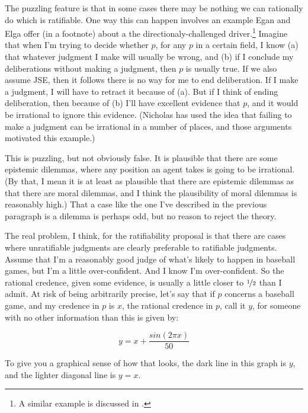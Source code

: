 The puzzling feature is that in some cases there may be nothing we can rationally do which is ratifiable. One way this can happen involves an example Egan and Elga offer (in a footnote) about a the directionaly-challenged driver.\footnote{A similar example is discussed in \citet{Christensen2010-CHRHE}.} Imagine that when I'm trying to decide whether \(p\), for any \(p\) in a certain field, I know (a) that whatever judgment I make will usually be wrong, and (b) if I conclude my deliberations without making a judgment, then \(p\) is usually true. If we also assume JSE, then it follows there is no way for me to end deliberation. If I make a judgment, I will have to retract it because of (a). But if I think of ending deliberation, then because of (b) I'll have excellent evidence that \(p\), and it would be irrational to ignore this evidence. (Nicholas \citet{Silins2005} has used the idea that failing to make a judgment can be irrational in a number of places, and those arguments motivated this example.)

This is puzzling, but not obviously false. It is plausible that there are some epistemic dilemmas, where any position an agent takes is going to be irrational. (By that, I mean it is at least as plausible that there are epistemic dilemmas as that there are moral dilemmas, and I think the plausibility of moral dilemmas is reasonably high.) That a case like the one I've described in the previous paragraph is a dilemma is perhaps odd, but no reason to reject the theory.

The real problem, I think, for the ratifiability proposal is that there are cases where unratifiable judgments are clearly preferable to ratifiable judgments. Assume that I'm a reasonably good judge of what's likely to happen in baseball games, but I'm a little over-confident. And I know I'm over-confident. So the rational credence, given some evidence, is usually a little closer to \(\nicefrac{1}{2}\) than I admit. At risk of being arbitrarily precise, let's say that if \(p\) concerns a baseball game, and my credence in \(p\) is \(x\), the rational credence in \(p\), call it \(y\), for someone with no other information than this is given by:

\begin{equation}
y = x + \frac{sin(2\pi x)}{50}
\end{equation}

\noindent To give you a graphical sense of how that looks, the dark line in this graph is \(y\), and the lighter diagonal line is \(y = x\).

